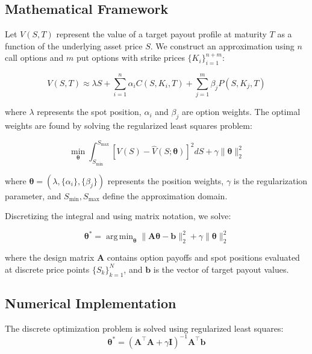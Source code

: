 \documentclass[12pt]{article}
\DeclareMathOperator*{\argmin}{arg\,min}
\begin{document}
\subsection{Mathematical Framework}
Let \( V(S, T) \) represent the value of a target payout profile at maturity \( T \)
as a function of the underlying asset price \( S \). We construct an approximation
using \( n \) call options and \( m \) put options with strike prices \( \{K_i\}_{i=1}^{n+m} \):

\begin{equation}
V(S, T) \approx \lambda S + \sum_{i=1}^{n} \alpha_i C(S, K_i, T) + \sum_{j=1}^{m} \beta_j P(S, K_j, T)
\end{equation}

where \( \lambda \) represents the spot position, \( \alpha_i \) and \( \beta_j \) are
option weights. The optimal weights are found by solving the regularized least squares
problem:

\begin{equation}
\min_{\boldsymbol{\theta}} \int_{S_{\min}}^{S_{\max}} \left[ V(S) - \hat{V}(S;\boldsymbol{\theta}) \right]^2 dS + \gamma \|\boldsymbol{\theta}\|_2^2
\end{equation}

where \( \boldsymbol{\theta} = (\lambda, \{\alpha_i\}, \{\beta_j\}) \) represents
the position weights, \( \gamma \) is the regularization parameter, and
\( S_{\min}, S_{\max} \) define the approximation domain.

Discretizing the integral and using matrix notation, we solve:

\begin{equation}
\boldsymbol{\theta}^* = \argmin_{\boldsymbol{\theta}} \|\mathbf{A}\boldsymbol{\theta} - \mathbf{b}\|_2^2 + \gamma \|\boldsymbol{\theta}\|_2^2
\end{equation}

where the design matrix \( \mathbf{A} \) contains option payoffs and spot positions
evaluated at discrete price points \( \{S_k\}_{k=1}^N \), and \( \mathbf{b} \) is
the vector of target payout values.

\subsection{Numerical Implementation}
The discrete optimization problem is solved using regularized least squares:
\begin{equation}
\boldsymbol{\theta}^* = (\mathbf{A}^\top \mathbf{A} + \gamma \mathbf{I})^{-1} \mathbf{A}^\top \mathbf{b}
\end{equation}
\end{document}
